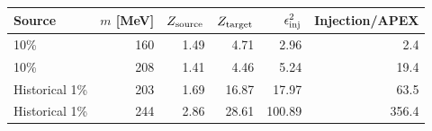 \begin{tabular}{lrrrrr}
\toprule
Source & $m$ [MeV] & $Z_{\rm source}$ & $Z_{\rm target}$ & $\epsilon^2_{\rm inj}$ & Injection/APEX \\
\midrule
10\% & 160 & 1.49 & 4.71 & 2.96 & 2.4 \\
10\% & 208 & 1.41 & 4.46 & 5.24 & 19.4 \\
Historical 1\% & 203 & 1.69 & 16.87 & 17.97 & 63.5 \\
Historical 1\% & 244 & 2.86 & 28.61 & 100.89 & 356.4 \\
\bottomrule
\end{tabular}
